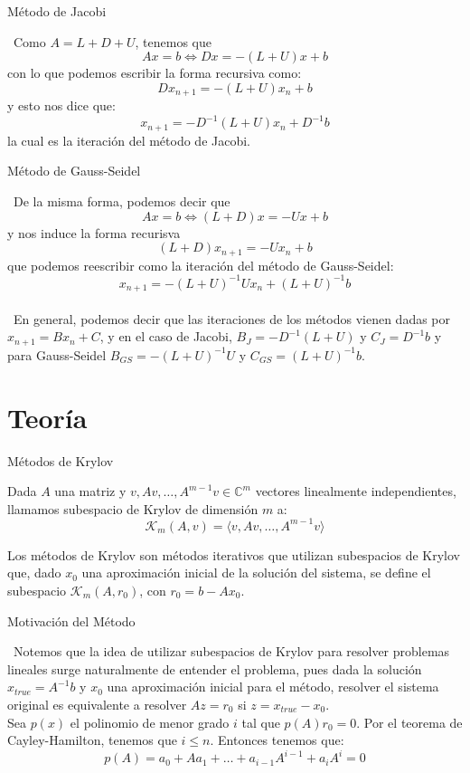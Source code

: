 \documentclass[12pt]{beamer}
\begin{document}
	\begin{frame}{Método de Jacobi}
		
		\ Como $A = L+D+U$, tenemos que $$Ax=b \iff Dx=-(L+U)x+b$$ con lo que podemos escribir la forma recursiva como: $$Dx_{n+1}=-(L+U)x_n+b$$ y esto nos dice que: $$x_{n+1}=-D^{-1}(L+U)x_n+D^{-1}b$$ la cual es la iteración del método de Jacobi.
		
	\end{frame}
	
	\begin{frame}{Método de Gauss-Seidel}
		
		\ De la misma forma, podemos decir que $$Ax=b \iff (L+D)x=-Ux+b$$ y nos induce la forma recurisva $$(L+D)x_{n+1}=-Ux_n+b$$ que podemos reescribir como la iteración del método de Gauss-Seidel: $$x_{n+1}=-(L+U)^{-1}Ux_n+(L+U)^{-1}b$$ \\
		\ En general, podemos decir que las iteraciones de los métodos vienen dadas por $x_{n+1}=Bx_n+C$, y en el caso de Jacobi, $B_J=-D^{-1}(L+U)$ y $C_J=D^{-1}b$ y para Gauss-Seidel $B_{GS}=-(L+U)^{-1}U$ y $C_{GS}=(L+U)^{-1}b$.
		
	\end{frame}
	
	\section{Teoría}
	
	\begin{frame}{Métodos de Krylov}
		
		\begin{definition}
			Dada $A$ una matriz y $v, Av, \dots , A^{m-1}v \in \mathbb{C}^m$ vectores linealmente independientes, llamamos subespacio de Krylov de dimensión $m$ a: $$\mathcal{K}_{m}(A, v) = \langle v, Av, \ldots, A^{m-1}v \rangle$$
		\end{definition} 
		Los métodos de Krylov son métodos iterativos que utilizan subespacios de Krylov que, dado $x_0$ una aproximación inicial de la solución del sistema, se define el subespacio $\mathcal{K}_{m}(A, r_0)$, con $r_0=b-Ax_0$.
		
	\end{frame}
	
	\begin{frame}{Motivación del Método}
		
		\ Notemos que la idea de utilizar subespacios de Krylov para resolver problemas lineales surge naturalmente de entender el problema, pues dada la solución $x_{true}=A^{-1}b$ y $x_0$ una aproximación inicial para el método, resolver el sistema original es equivalente a resolver $Az=r_0$ si $z=x_{true}-x_0$. \\ Sea $p(x)$ el polinomio de menor grado $i$ tal que $p(A)r_0=0$. Por el teorema de Cayley-Hamilton, tenemos que $i\leq n$. Entonces tenemos que: $$p(A)=a_0+Aa_1+\dots+a_{i-1}A^{i-1}+a_iA^i=0$$ 
		
	\end{frame}
	
\end{document}
